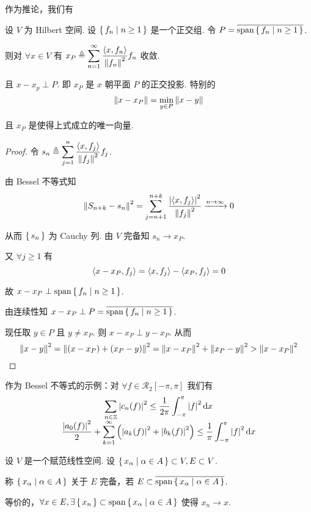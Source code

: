 作为推论，我们有

\begin{inference}
    设 $V$ 为 Hilbert 空间. 设 $\set{f_n|n\ge 1}$ 是一个正交组. 令 $P=\overline{\mathrm{span}\set{f_n|n\ge 1}}$.

    则对 $\forall x\in V$ 有 $x_P\triangleq\displaystyle\sum_{n=1}^\infty\frac{\left\langle{x,f_n}\right\rangle}{\left\lVert{f_n}\right\rVert^2}f_n$ 收敛.

    且 $x-x_p\perp P$. 即 $x_P$ 是 $x$ 朝平面 $P$ 的正交投影. 特别的
$$
\left\lVert{x-x_P}\right\rVert=\min_{y\in P}\left\lVert{x-y}\right\rVert
$$

    且 $x_P$ 是使得上式成立的唯一向量.
\end{inference}
\begin{proof}
    令 $s_n\triangleq\displaystyle\sum_{j=1}^n\frac{\left\langle{x,f_j}\right\rangle}{\left\lVert{f_j}\right\rVert^2}f_j$.

    由 Bessel 不等式知
$$
\left\lVert{S_{n+k}-s_n}\right\rVert^2=\sum_{j=n+1}^{n+k}\frac{\left\lvert{\left\langle{x,f_j}\right\rangle}\right\rvert^2}{\left\lVert{f_j}\right\rVert^2}\xrightarrow{n\to\infty}0
$$

    从而 $\set{s_n}$ 为 Cauchy 列. 由 $V$ 完备知 $s_n\to x_P$.

    又 $\forall j\ge 1$ 有
$$
\left\langle{x-x_P,f_j}\right\rangle=\left\langle{x,f_j}\right\rangle-\left\langle{x_P,f_j}\right\rangle=0
$$

    故 $x-x_P\perp\mathrm{span}\set{f_n|n\ge 1}$.

    由连续性知 $x-x_P\perp P=\overline{\mathrm{span}\set{f_n|n\ge 1}}$.

    现任取 $y\in P$ 且 $y\ne x_P$. 则 $x-x_P\perp y-x_P$. 从而
$$
\left\lVert{x-y}\right\rVert^2=\left\lVert{(x-x_P)+(x_P-y)}\right\rVert^2=\left\lVert{x-x_P}\right\rVert^2+\left\lVert{x_P-y}\right\rVert^2>\left\lVert{x-x_P}\right\rVert^2
$$
\end{proof}

作为 Bessel 不等式的示例：对 $\forall f\in \mathcal{R}_2[-\pi,\pi]$ 我们有
$$
\begin{array}{c}
    \displaystyle\sum_{n\in\mathbb{Z}}\left\lvert{c_n(f)}\right\rvert^2\le\frac{1}{2\pi}\int_{-\pi}^\pi\left\lvert{f}\right\rvert^2\mathrm{d} x\\
    \displaystyle\frac{\left\lvert{a_0(f)}\right\rvert^2}{2}+\sum_{k=1}^\infty\left(\left\lvert{a_k(f)}\right\rvert^2+\left\lvert{b_k(f)}\right\rvert^2\right)\le\frac{1}{\pi}\int_{-\pi}^\pi\left\lvert{f}\right\rvert^2\mathrm{d} x
\end{array}
$$


\begin{definition}
    设 $V$ 是一个赋范线性空间. 设 $\set{x_\alpha|\alpha\in A}\subset V,E\subset V$.

    称 $\set{x_\alpha|\alpha\in A}$ 关于 $E$ 完备，若 $E\subset\overline{\mathrm{span}\set{x_\alpha|\alpha\in A}}$.

    等价的，$\forall x\in E,\exists\set{x_n}\subset\mathrm{span}\set{x_\alpha|\alpha\in A}$ 使得 $x_n\to x$.
\end{definition}

